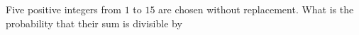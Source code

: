 Five positive integers from $1$ to $15$ are chosen without replacement.  What is the probability that their sum is divisible by 